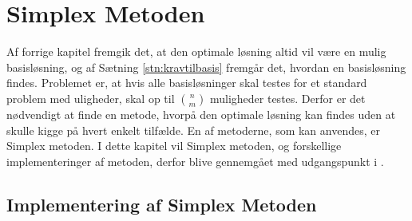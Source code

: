 \chapter{Simplex Metoden}\label{chap:simp}
Af forrige kapitel fremgik det, at den optimale løsning altid vil være en mulig basisløsning, og af Sætning \ref{stn:kravtilbasis}
fremgår det, hvordan en basisløsning findes. 
Problemet er, at hvis alle basisløsninger skal testes for et standard problem med uligheder, skal op til $\binom{n}{m}$ muligheder testes. 
Derfor er det nødvendigt at finde en metode, hvorpå den optimale løsning kan findes uden at skulle kigge på hvert enkelt tilfælde. 
En af metoderne, som kan anvendes, er Simplex metoden. I dette kapitel vil Simplex metoden, og forskellige implementeringer af metoden, derfor blive gennemgået med udgangspunkt i \citep{bert}.



\section{Implementering af Simplex Metoden}



